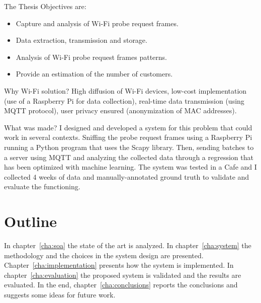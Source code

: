 The Thesis Objectives are:
\begin{itemize}
  \item Capture and analysis of Wi-Fi probe request frames.
  \item Data extraction, transmission and storage.
  \item Analysis of Wi-Fi probe request frames patterns.
  \item Provide an estimation of the number of customers.
\end{itemize}

Why Wi-Fi solution?
High diffusion of Wi-Fi devices, low-cost implementation (use of a Raspberry Pi for data collection), real-time data transmission (using MQTT protocol), user privacy ensured (anonymization of MAC addresses).

What was made?
I designed and developed a system for this problem that could work in several contexts.
Sniffing the probe request frames using a Raspberry Pi running a Python program that uses the Scapy library. Then, sending batches to a server using MQTT and analyzing the collected data through a regression that has been optimized with machine learning.
The system was tested in a Cafe and I collected 4 weeks of data and manually-annotated ground truth to validate and evaluate the functioning.


\section{Outline} 
\label{sec:outline}
\vspace{0.2 cm} 

In chapter~\ref{cha:soa} the state of the art is analyzed.
In chapter~\ref{cha:system} the methodology and the choices in the system design are presented.
Chapter~\ref{cha:implementation}  presents how the system is implemented.
In chapter~\ref{cha:evaluation} the proposed system is validated and the results are evaluated.
In the end, chapter~\ref{cha:conclusions} reports the conclusions and suggests some ideas for future work.
